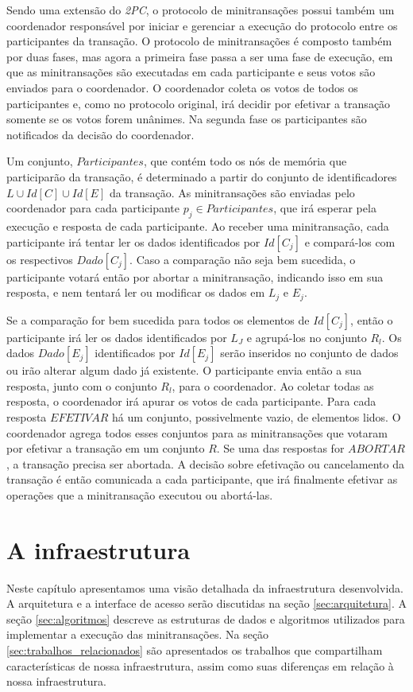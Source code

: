 \documentclass[11pt,twoside,a4paper]{book}
\begin{document}
Sendo uma extensão do \emph{2PC}, o protocolo de minitransações possui também um coordenador responsável por iniciar e gerenciar a execução do protocolo entre os participantes da transação. O protocolo de minitransações é composto também por duas fases, mas agora a primeira fase passa a ser uma fase de execução, em que as minitransações são executadas em cada participante e seus votos são enviados para o coordenador. O coordenador coleta os votos de todos os participantes e, como no protocolo original, irá decidir por efetivar a transação somente se os votos forem unânimes. Na segunda fase os participantes são notificados da decisão do coordenador. 

Um conjunto, $Participantes$, que contém todo os nós de memória que participarão da transação, é determinado a partir do conjunto de identificadores $L \cup Id[C] \cup Id[E]$ da transação. As minitransações são enviadas pelo coordenador para cada participante $p_j \in Participantes$, que irá esperar pela execução e resposta de cada participante. Ao receber uma minitransação, cada participante irá tentar ler os dados identificados por $Id[C_j]$ e compará-los com os respectivos $Dado[C_j]$. Caso a comparação não seja bem sucedida, o participante votará então por abortar a minitransação, indicando isso em sua resposta, e nem tentará ler ou modificar os dados em $L_j$ e $E_j$.

Se a comparação for bem sucedida para todos os elementos de $Id[C_j]$, então o participante irá ler os dados identificados por $L_J$ e agrupá-los no conjunto $R_l$. Os dados $Dado[E_j]$ identificados por $Id[E_j]$ serão inseridos no conjunto de dados ou irão alterar algum dado já existente. O participante envia então a sua resposta, junto com o conjunto $R_l$, para o coordenador. Ao coletar todas as resposta, o coordenador irá apurar os votos de cada participante. Para cada resposta $EFETIVAR$ há um conjunto, possivelmente vazio, de elementos lidos. O coordenador agrega todos esses conjuntos para as minitransações que votaram por efetivar a transação em um conjunto $R$. Se uma das respostas for $ABORTAR$, a transação precisa ser abortada. A decisão sobre efetivação ou cancelamento da transação é então comunicada a cada participante, que irá finalmente efetivar as operações que a minitransação executou ou abortá-las. 

\chapter{A infraestrutura}
\label{chap:implementacao}
Neste capítulo apresentamos uma visão detalhada da infraestrutura desenvolvida. A arquitetura e a interface de acesso serão discutidas na seção \ref{sec:arquitetura}. A seção \ref{sec:algoritmos} descreve as estruturas de dados e algoritmos utilizados para implementar a execução das minitransações. Na seção \ref{sec:trabalhos_relacionados} são apresentados os trabalhos que compartilham características de nossa infraestrutura, assim como suas diferenças em relação à nossa infraestrutura. 
\end{document}
